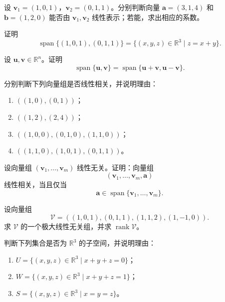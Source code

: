 \begin{exercise}
    \label{exer_vector_2}
    设 \(\bm v_1=(1,0,1)\)，\(\bm v_2=(0,1,1)\)。分别判断向量 \(\bm a=(3,1,4)\) 和 \(\bm b=(1,2,0)\) 能否由 \(\bm v_1,\bm v_2\) 线性表示；若能，求出相应的系数。
\end{exercise}

\begin{exercise}
    \label{exer_vector_3}
    证明
    \[
        \operatorname{span}\{(1,0,1),(0,1,1)\}
        =\{(x,y,z)\in\mathbb R^3\mid z=x+y\}.
    \]
\end{exercise}

\begin{exercise}
    \label{exer_vector_4}
    设 \(\bm u,\bm v\in\mathbb R^n\)。证明
    \[
        \operatorname{span}\{\bm u,\bm v\}
        =\operatorname{span}\{\bm u+\bm v,\bm u-\bm v\}.
    \]
\end{exercise}

\begin{exercise}
    \label{exer_vector_5}
    分别判断下列向量组是否线性相关，并说明理由：
    \begin{enumerate}
        \item \(((1,0),(0,1))\)；
        \item \(((1,2),(2,4))\)；
        \item \(((1,0,0),(0,1,0),(1,1,0))\)；
        \item \(((1,1,0),(1,0,1),(0,1,1))\)。
    \end{enumerate}
\end{exercise}

\begin{exercise}
    \label{exer_vector_6}
    设向量组 \((\bm v_1,\ldots,\bm v_m)\) 线性无关。证明：向量组
    \[
        (\bm v_1,\ldots,\bm v_m,\bm a)
    \]
    线性相关，当且仅当
    \[
        \bm a\in\operatorname{span}\{\bm v_1,\ldots,\bm v_m\}.
    \]
\end{exercise}

\begin{exercise}
    \label{exer_vector_7}
    设向量组
    \[
        \mathcal V=((1,0,1),(0,1,1),(1,1,2),(1,-1,0)).
    \]
    求 \(\mathcal V\) 的一个极大线性无关组，并求 \(\operatorname{rank}\mathcal V\)。
\end{exercise}

\begin{exercise}
    \label{exer_vector_8}
    判断下列集合是否为 \(\mathbb R^3\) 的子空间，并说明理由：
    \begin{enumerate}
        \item \(U=\{(x,y,z)\in\mathbb R^3\mid x+y+z=0\}\)；
        \item \(W=\{(x,y,z)\in\mathbb R^3\mid x+y+z=1\}\)；
        \item \(S=\{(x,y,z)\in\mathbb R^3\mid x=y=z\}\)。
    \end{enumerate}
\end{exercise}

